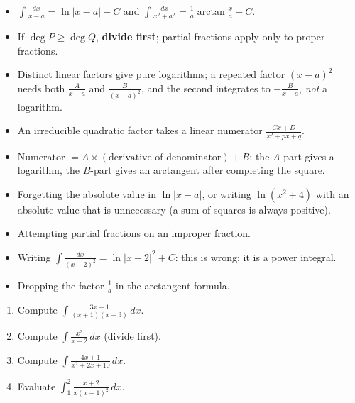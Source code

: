 \documentclass[11pt]{article}
\begin{document}
\begin{aretenir}
\begin{itemize}
\item $\displaystyle\int\frac{dx}{x-a}=\ln|x-a|+C$ and $\displaystyle\int\frac{dx}{x^{2}+a^{2}}=\frac{1}{a}\arctan\frac{x}{a}+C$.
\item If $\deg P\geq\deg Q$, \textbf{divide first}; partial fractions apply only to proper fractions.
\item Distinct linear factors give pure logarithms; a repeated factor $(x-a)^{2}$ needs both $\frac{A}{x-a}$ and $\frac{B}{(x-a)^{2}}$, and the second integrates to $-\frac{B}{x-a}$, \emph{not} a logarithm.
\item An irreducible quadratic factor takes a linear numerator $\frac{Cx+D}{x^{2}+px+q}$.
\item Numerator $=A\times(\text{derivative of denominator})+B$: the $A$-part gives a logarithm, the $B$-part gives an arctangent after completing the square.
\end{itemize}
\end{aretenir}

\begin{attention}
\begin{itemize}
\item Forgetting the absolute value in $\ln|x-a|$, or writing $\ln(x^{2}+4)$ with an absolute value that is unnecessary (a sum of squares is always positive).
\item Attempting partial fractions on an improper fraction.
\item Writing $\int\frac{dx}{(x-2)^{2}}=\ln|x-2|^{2}+C$: this is wrong; it is a power integral.
\item Dropping the factor $\frac{1}{a}$ in the arctangent formula.
\end{itemize}
\end{attention}

\begin{exercice}[Practice]
\begin{enumerate}
\item Compute $\displaystyle\int\frac{3x-1}{(x+1)(x-3)}\,dx$.
\item Compute $\displaystyle\int\frac{x^{3}}{x-2}\,dx$ (divide first).
\item Compute $\displaystyle\int\frac{4x+1}{x^{2}+2x+10}\,dx$.
\item Evaluate $\displaystyle\int_{1}^{2}\frac{x+2}{x(x+1)^{2}}\,dx$.
\end{enumerate}
\end{exercice}
\end{document}
